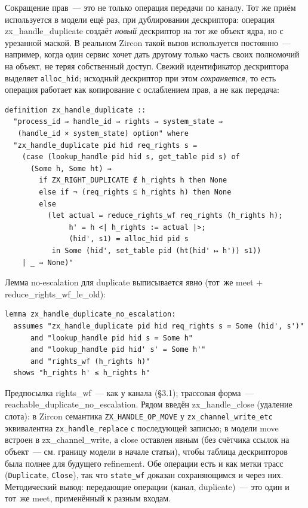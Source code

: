 \documentclass[11pt,a4paper]{article}
\newcommand{\isabel}[1]{{\isabelleit #1}}
\newcommand{\lemmaname}[1]{\isabel{#1}}
\begin{document}
Сокращение прав~--- это не только операция передачи по каналу. Тот же
приём используется в модели ещё раз, при дублировании дескриптора:
операция \lemmaname{zx\_handle\_duplicate} создаёт \emph{новый}
дескриптор на тот же объект ядра, но с урезанной маской. В реальном
Zircon такой вызов используется постоянно~--- например, когда один
сервис хочет дать другому только часть своих полномочий на объект,
не теряя собственный доступ. Свежий идентификатор дескриптора выделяет
\texttt{alloc\_hid}; исходный дескриптор при этом \emph{сохраняется},
то есть операция работает как копирование с ослаблением прав, а не как
передача:
\begin{lstlisting}
definition zx_handle_duplicate ::
  "process_id ⇒ handle_id ⇒ rights ⇒ system_state ⇒
   (handle_id × system_state) option" where
  "zx_handle_duplicate pid hid req_rights s =
    (case (lookup_handle pid hid s, get_table pid s) of
      (Some h, Some ht) ⇒
        if ZX_RIGHT_DUPLICATE ∉ h_rights h then None
        else if ¬ (req_rights ⊆ h_rights h) then None
        else
          (let actual = reduce_rights_wf req_rights (h_rights h);
               h' = h <| h_rights := actual |>;
               (hid', s1) = alloc_hid pid s
           in Some (hid', set_table pid (ht(hid' ↦ h')) s1))
    | _ ⇒ None)"
\end{lstlisting}
Лемма no-escalation для duplicate выписывается явно (тот~же meet +
\lemmaname{reduce\_rights\_wf\_le\_old}):
\begin{lstlisting}
lemma zx_handle_duplicate_no_escalation:
  assumes "zx_handle_duplicate pid hid req_rights s = Some (hid', s')"
      and "lookup_handle pid hid s = Some h"
      and "lookup_handle pid hid' s' = Some h'"
      and "rights_wf (h_rights h)"
  shows "h_rights h' ≤ h_rights h"
\end{lstlisting}
Предпосылка \lemmaname{rights\_wf}~--- как у канала (§3.1); трассовая
форма~--- \lemmaname{reachable\_duplicate\_no\_escalation}.
Рядом введён \lemmaname{zx\_handle\_close} (удаление слота): в
Zircon семантика \texttt{ZX\_HANDLE\_OP\_MOVE} у
\texttt{zx\_channel\_write\_etc} эквивалентна
\texttt{zx\_handle\_replace} с последующей записью; в модели move
встроен в \lemmaname{zx\_channel\_write}, а close оставлен явным (без
счётчика ссылок на объект~--- см. границу модели в начале статьи), чтобы
таблица дескрипторов была полнее для будущего refinement. Обе операции
есть и как метки трасс (\texttt{Duplicate}, \texttt{Close}), так что
\texttt{state\_wf} доказан сохраняющимся и через них. Методический вывод:
передающие операции (канал, duplicate)~--- это один и тот~же meet,
применённый к разным входам.
\end{document}
